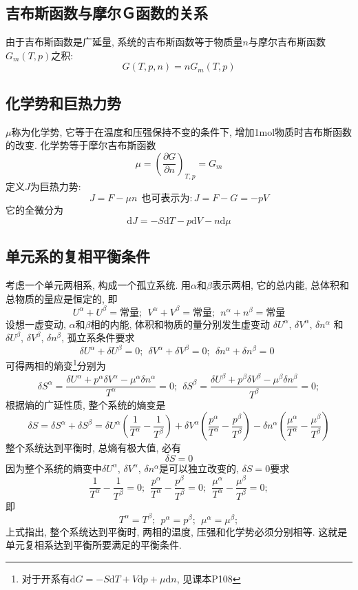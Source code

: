 \subsection{吉布斯函数与摩尔Ｇ函数的关系}
由于吉布斯函数是广延量, 系统的吉布斯函数等于物质量$n$与摩尔吉布斯函数$G_m(T,p)$之积:
$$
    G(T,p,n)=nG_m(T,p)
$$

\subsection{化学势和巨热力势}
$\mu$称为化学势, 它等于在温度和压强保持不变的条件下, 增加1mol物质时吉布斯函数的改变. 化学势等于摩尔吉布斯函数
$$
    \mu=\left(\frac{\partial G}{\partial n}\right)_{T,p}=G_m
$$
定义$J$为巨热力势:
$$J=F-\mu n　\ \ \mathrm{也可表示为: }  J=F-G=-pV$$
它的全微分为
$$
    \mathrm{d}J=-S\mathrm{d}T-p\mathrm{d}V-n\mathrm{d}\mu
$$

\subsection{单元系的复相平衡条件}
考虑一个单元两相系, 构成一个孤立系统. 用$\alpha$和$\beta$表示两相, 它的总内能, 总体积和总物质的量应是恒定的, 即
$$
    U^\alpha+U^\beta=\mathrm{常量};　\ \
    V^\alpha+V^\beta=\mathrm{常量};　\ \
    n^\alpha+n^\beta=\mathrm{常量}
$$
设想一虚变动, $\alpha$和$\beta$相的内能, 体积和物质的量分别发生虚变动
$\delta U^\alpha $, $\delta V^\alpha$, $\delta n^\alpha$ 和
$\delta U^\beta$, $\delta V^\beta$, $\delta
    n^\beta$, 孤立系条件要求
$$
    \delta U^\alpha+\delta U^\beta=0; \ \ \delta V^\alpha+\delta
    V^\beta=0; \ \ \delta n^\alpha+\delta n^\beta=0 \ \
$$
可得两相的熵变\footnote{对于开系有$\mathrm{d}G=-S\mathrm{d}T+V\mathrm{d}p+\mu\mathrm{d}n
    $, 见课本P108}分别为
$$
    \delta S^\alpha=\frac{\delta U^\alpha+p^\alpha\delta
        V^\alpha-\mu^\alpha\delta n^\alpha}{T^\alpha}=0; \ \ \delta
    S^\beta=\frac{\delta U^\beta+p^\beta\delta V^\beta-\mu^\beta\delta
        n^\beta}{T^\beta}=0;
$$
根据熵的广延性质, 整个系统的熵变是
$$
    \delta S=\delta S^\alpha+\delta S^\beta=\delta
    U^\alpha\left(\frac{1}{T^\alpha}-\frac{1}{T^\beta}\right)+\delta
    V^\alpha
    \left(\frac{p^\alpha}{T^\alpha}-\frac{p^\beta}{T^\beta}\right)-\delta
    n^\alpha\left(\frac{\mu^\alpha}{T^\alpha}-\frac{\mu^\beta}{T^\beta}\right)
$$
整个系统达到平衡时, 总熵有极大值, 必有
$$
    \delta S=0
$$
因为整个系统的熵变中$\delta U^\alpha$, $\delta V^\alpha$, $\delta
    n^\alpha$是可以独立改变的, $\delta S=0$要求
$$
    \frac{1}{T^\alpha}-\frac{1}{T^\beta}=0; \ \
    \frac{p^\alpha}{T^\alpha}-\frac{p^\beta}{T^\beta}=0; \ \
    \frac{\mu^\alpha}{T^\alpha}-\frac{\mu^\beta}{T^\beta}=0;
$$
即
$$
    T^\alpha=T^\beta; \ \ p^\alpha=p^\beta; \ \ \mu^\alpha=\mu^\beta;
$$
上式指出, 整个系统达到平衡时, 两相的温度, 压强和化学势必须分别相等. 这就是单元复相系达到平衡所要满足的平衡条件.

